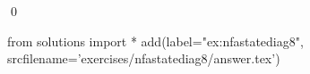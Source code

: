 
\begin{ex} 
  \label{ex:nfastatediag8}
  
  \qed
\end{ex} 
\begin{python0}
from solutions import *
add(label="ex:nfastatediag8",
    srcfilename='exercises/nfastatediag8/answer.tex') 
\end{python0}
